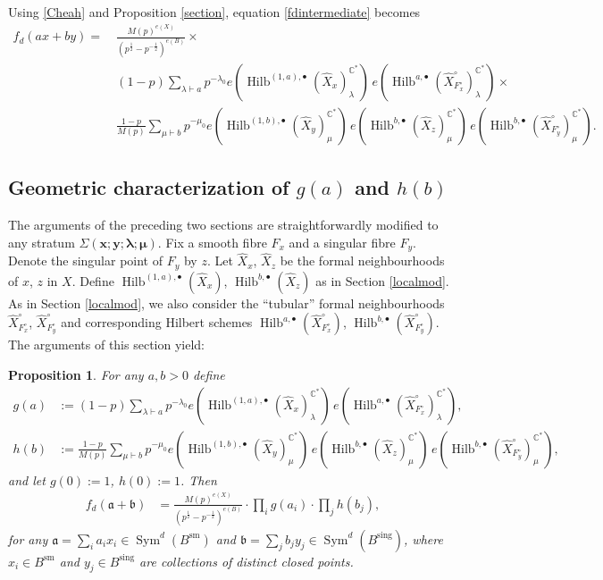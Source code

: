 \documentclass{amsart}
\newtheorem{proposition}[theorem]{Proposition}
\theoremstyle{definition}
\newcommand{\CC} {\mathbb{C}}          %
\newcommand{\Sym}{\operatorname{Sym}}
\newcommand{\Hilb}{\operatorname{Hilb}}
\newcommand{\sm}{\operatorname{sm}}
\newcommand{\sing}{\operatorname{sing}}
\begin{document}
Using \eqref{Cheah} and Proposition \ref{section}, equation \eqref{fdintermediate} becomes
\begin{align*}
f_d(ax+by) = \ &\frac{M(p)^{e(X)}}{(p^{\frac{1}{2}}-p^{-\frac{1}{2}})^{e(B)}} \times \\
&(1-p) \sum_{\lambda \vdash a} p^{-\lambda_0} e(\Hilb^{(1,a),\bullet}(\widehat{X}_x)_{\lambda}^{\CC^*}) \, e(\Hilb^{a,\bullet}(\widehat{X}^{\circ}_{F_{x}^{\circ}})_{\lambda}^{\CC^*}) \times \\
&\frac{1-p}{M(p)} \sum_{\mu \vdash b} p^{-\mu_0} e(\Hilb^{(1,b),\bullet}(\widehat{X}_y)_{\mu}^{\CC^*}) \, e(\Hilb^{b,\bullet}(\widehat{X}_z)_{\mu}^{\CC^*}) \, e(\Hilb^{b,\bullet}(\widehat{X}^{\circ}_{F_{y}^{\circ}})_{\mu}^{\CC^*}).
\end{align*}

   
\subsection{Geometric characterization of $g(a)$ and $h(b)$} \label{chargh}

The arguments of the preceding two sections are straightforwardly modified to any stratum $\Sigma(\boldsymbol{x};\boldsymbol{y};\boldsymbol{\lambda};\boldsymbol{\mu})$. Fix a smooth fibre $F_x$ and a singular fibre $F_y$. Denote the singular point of $F_y$ by $z$. Let $\widehat{X}_x$, $\widehat{X}_z$ be the formal neighbourhoods of $x$, $z$ in $X$. Define $\Hilb^{(1,a),\bullet}(\widehat{X}_x)$, $\Hilb^{b,\bullet}(\widehat{X}_z)$ as in Section \ref{localmod}. As in Section \ref{localmod}, we also consider the ``tubular'' formal neighbourhoods $\widehat{X}^{\circ}_{F_{x}^{\circ}}$, $\widehat{X}^{\circ}_{F_{y}^{\circ}}$ and corresponding Hilbert schemes $\Hilb^{a,\bullet}(\widehat{X}^{\circ}_{F_{x}^{\circ}})$, $\Hilb^{b,\bullet}(\widehat{X}^{\circ}_{F_{y}^{\circ}})$. The arguments of this section yield:
\begin{proposition} \label{geomgh}
For any $a,b>0$ define
\begin{align*}
g(a) &:= (1-p) \sum_{\lambda \vdash a} p^{-\lambda_0} e(\Hilb^{(1,a),\bullet}(\widehat{X}_x)_{\lambda}^{\CC^*}) \, e(\Hilb^{a,\bullet}(\widehat{X}^{\circ}_{F_{x}^{\circ}})_{\lambda}^{\CC^*}), \\
h(b) &:= \frac{1-p}{M(p)} \sum_{\mu \vdash b} p^{-\mu_0} e(\Hilb^{(1,b),\bullet}(\widehat{X}_y)_{\mu}^{\CC^*}) \, e(\Hilb^{b,\bullet}(\widehat{X}_z)_{\mu}^{\CC^*}) \, e(\Hilb^{b,\bullet}(\widehat{X}^{\circ}_{F_{y}^{\circ}})_{\mu}^{\CC^*}),
\end{align*}
and let $g(0) := 1$, $h(0) :=1$. Then
\begin{align*}
f_{d}(\mathfrak{a} + \mathfrak{b}) &= \frac{M(p)^{e(X)}}{(p^{\frac{1}{2}}-p^{-\frac{1}{2}})^{e(B)}} \cdot \prod_{i} g(a_i) \cdot \prod_{j} h(b_j), 
\end{align*}
for any $\mathfrak{a} = \sum_i a_i x_i \in \Sym^{d}(B^{\sm})$ and $\mathfrak{b} = \sum_j b_j y_j \in \Sym^{d}(B^{\sing})$, where $x_i \in B^{\sm}$ and $y_j \in B^{\sing}$ are collections of distinct closed points.
\end{proposition}
   
\end{document}
